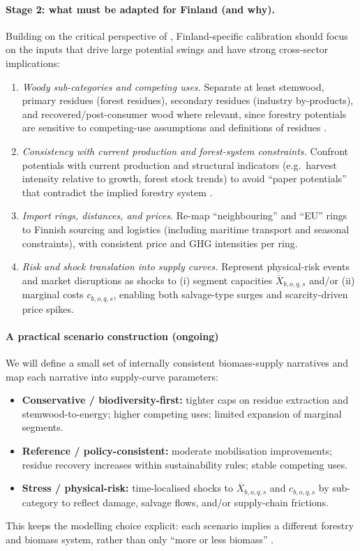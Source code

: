 \documentclass{article}
\begin{document}
\paragraph{Stage 2: what must be adapted for Finland (and why).}
Building on the critical perspective of \citet{colla_navigating_2024}, Finland-specific calibration should focus on the inputs that drive large potential swings and have strong cross-sector implications:
\begin{enumerate}
    \item \textit{Woody sub-categories and competing uses.} Separate at least stemwood, primary residues (forest residues), secondary residues (industry by-products), and recovered/post-consumer wood where relevant, since forestry potentials are sensitive to competing-use assumptions and definitions of residues \citep{colla_navigating_2024}.
    \item \textit{Consistency with current production and forest-system constraints.} Confront potentials with current production and structural indicators (e.g.\ harvest intensity relative to growth, forest stock trends) to avoid ``paper potentials'' that contradict the implied forestry system \citep{colla_navigating_2024}.
    \item \textit{Import rings, distances, and prices.} Re-map ``neighbouring'' and ``EU'' rings to Finnish sourcing and logistics (including maritime transport and seasonal constraints), with consistent price and GHG intensities per ring.
    \item \textit{Risk and shock translation into supply curves.} Represent physical-risk events and market disruptions as shocks to (i) segment capacities $\overline{X}_{b,o,q,s}$ and/or (ii) marginal costs $c_{b,o,q,s}$, enabling both salvage-type surges and scarcity-driven price spikes.
\end{enumerate}

\paragraph{A practical scenario construction (ongoing)}
We will define a small set of internally consistent biomass-supply narratives and map each narrative into supply-curve parameters:
\begin{itemize}
    \item \textbf{Conservative / biodiversity-first:} tighter caps on residue extraction and stemwood-to-energy; higher competing uses; limited expansion of marginal segments.
    \item \textbf{Reference / policy-consistent:} moderate mobilisation improvements; residue recovery increases within sustainability rules; stable competing uses.
    \item \textbf{Stress / physical-risk:} time-localised shocks to $\overline{X}_{b,o,q,s}$ and $c_{b,o,q,s}$ by sub-category to reflect damage, salvage flows, and/or supply-chain frictions.
\end{itemize}
This keeps the modelling choice explicit: each scenario implies a different forestry and biomass system, rather than only ``more or less biomass'' \citep{colla_navigating_2024}.
\end{document}
